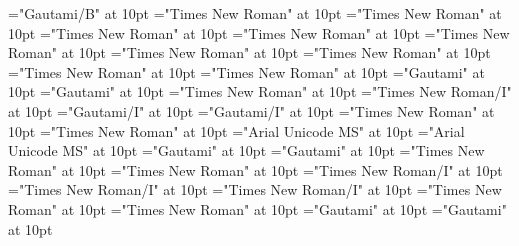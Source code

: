 \documentclass[c5paper,twoside]{article}
\begin{document}
\font\LexEntrypublishStemComponentTargetHeadWordRefaentryrefcomponentprimaryrefsentryletDatadicBody="Gautami/B" at 10pt
\font\aentryrefcomponentprimaryrefsentryletDatadicBody="Times New Roman" at 10pt
\font\entryrefcomponentprimaryrefsentryletDatadicBody="Times New Roman" at 10pt
\font\spanenspanenentryreftypeprimaryrefsentryletDatadicBody="Times New Roman" at 10pt
\font\spanenentryreftypeprimaryrefsentryletDatadicBody="Times New Roman" at 10pt
\font\entryreftypeprimaryrefsentryletDatadicBody="Times New Roman" at 10pt
\font\spanenprimaryrefsentryletDatadicBody="Times New Roman" at 10pt
\font\primaryrefsentryletDatadicBody="Times New Roman" at 10pt
\font\spanenexamplessensesensesentryletDatadicBody="Times New Roman" at 10pt
\font\spanentranslationLdtranslationsxitemexamplessensesensesentryletDatadicBody="Times New Roman" at 10pt
\font\spantetranslationLdtranslationsxitemexamplessensesensesentryletDatadicBody="Gautami" at 10pt
\font\translationLdtranslationsxitemexamplessensesensesentryletDatadicBody="Gautami" at 10pt
\font\translationsxitemexamplessensesensesentryletDatadicBody="Times New Roman" at 10pt
\font\spanenexamplexitemexamplessensesensesentryletDatadicBody="Times New Roman/I" at 10pt
\font\spanggoTeluINexamplexitemexamplessensesensesentryletDatadicBody="Gautami/I" at 10pt
\font\examplexitemexamplessensesensesentryletDatadicBody="Gautami/I" at 10pt
\font\xitemexamplessensesensesentryletDatadicBody="Times New Roman" at 10pt
\font\examplessensesensesentryletDatadicBody="Times New Roman" at 10pt
\font\spanhixitemhiLexSensepublishStemGlossPubLdsensesensesentryletDatadicBody="Arial Unicode MS" at 10pt
\font\xitemhiLexSensepublishStemGlossPubLdsensesensesentryletDatadicBody="Arial Unicode MS" at 10pt
\font\spantexitemteLexSensepublishStemGlossPubLdsensesensesentryletDatadicBody="Gautami" at 10pt
\font\xitemteLexSensepublishStemGlossPubLdsensesensesentryletDatadicBody="Gautami" at 10pt
\font\xsensenumberaftersensesensesentryletDatadicBody="Times New Roman" at 10pt
\font\xsensenumbersensesensesentryletDatadicBody="Times New Roman" at 10pt
\font\spanenspanengrammaticalinfoentryletDatadicBody="Times New Roman/I" at 10pt
\font\spanengrammaticalinfoentryletDatadicBody="Times New Roman/I" at 10pt
\font\grammaticalinfoentryletDatadicBody="Times New Roman/I" at 10pt
\font\spanensensesentryletDatadicBody="Times New Roman" at 10pt
\font\spanenLexSensepublishStemGlossPubLdsensesensesentryletDatadicBody="Times New Roman" at 10pt
\font\spanteLexSensepublishStemGlossPubLdsensesensesentryletDatadicBody="Gautami" at 10pt
\font\LexSensepublishStemGlossPubLdsensesensesentryletDatadicBody="Gautami" at 10pt
\end{document}
